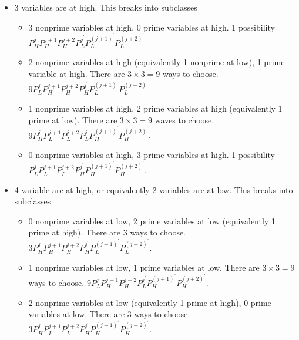 \documentclass[12pt,letterpaper,leqno]{amsart}
\theoremstyle{plain}
\numberwithin{equation}{section}
\numberwithin{theorem}{section}
\numberwithin{proposition}{section}
\numberwithin{lemma}{section}
\numberwithin{corollary}{section}
\begin{document}
\begin{itemize}
\item 3 variables are at high. This breaks into subclasses

\begin{itemize}
\item 3 nonprime variables at high, 0 prime variables at high. 1 possibility%
\newline
$P^j_H P^{j+1}_H P_H^{j+2} P_L^{j^{\prime }} P_L^{(j+1)^{\prime }}
P_L^{(j+2)^{\prime }}$

\item 2 nonprime variables at high (equivalently 1 nonprime at low), 1 prime
variable at high. There are $3\times 3=9$ ways to choose. $9 P^j_L P^{j+1}_H
P^{j+2}_H P_H^{j^{\prime }} P_L^{(j+1)^{\prime }} P_L^{(j+2)^{\prime }}$

\item 1 nonprime variables at high, 2 prime variables at high (equivalently
1 prime at low). There are $3\times 3=9$ waves to choose. $9 P^j_H P^{j+1}_L
P^{j+2}_L P_L^{j^{\prime }} P^{(j+1)^{\prime }}_H P^{(j+2)^{\prime }}_H$.

\item 0 nonprime variables at high, 3 prime variables at high. 1 possibility%
\newline
$P^j_L P^{j+1}_L P^{j+2}_L P^{j^{\prime }}_H P^{(j+1)^{\prime }}_H
P^{(j+2)^{\prime }}_H$.
\end{itemize}

\item 4 variable are at high, or equivalently 2 variables are at low. This
breaks into subclasses

\begin{itemize}
\item 0 nonprime variables at low, 2 prime variables at low (equivalently 1
prime at high). There are $3$ ways to choose. $3P^j_H P^{j+1}_H P^{j+2}_H
P^{j^{\prime }}_H P^{(j+1)^{\prime }}_L P^{(j+2)^{\prime }}_L$.

\item 1 nonprime variables at low, 1 prime variables at low. There are $%
3\times 3=9$ ways to choose. $9P^j_L P^{j+1}_H P^{j+2}_H P^{j^{\prime }}_L
P^{(j+1)^{\prime }}_H P^{(j+2)^{\prime }}_H$.

\item 2 nonprime variables at low (equivalently 1 prime at high), 0 prime
variables at low. There are $3$ ways to choose. $3P^j_H P^{j+1}_L P^{j+2}_L
P^{j^{\prime }}_H P^{(j+1)^{\prime }}_H P^{(j+2)^{\prime }}_H$.
\end{itemize}


\end{itemize}
\end{document}
